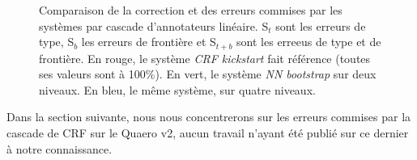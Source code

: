 \documentclass[PhD-Yoann-Dupont.tex]{subfiles}
\begin{document}
\begin{figure}[ht!]
\centering
{}
\caption{Comparaison de la correction et des erreurs commises par les systèmes par cascade d'annotateurs linéaire. S$_{t}$ sont les erreurs de type,  S$_{b}$ les erreurs de frontière et  S$_{t+b}$  sont les erreeus de type et de frontière. En rouge, le système \textit{CRF kickstart} fait référence (toutes ses valeurs sont à 100\%). En vert, le système \textit{NN bootstrap} sur deux niveaux. En bleu, le même système, sur quatre niveaux.}
\label{fig:cascades-error-comparison}
\end{figure}

Dans la section suivante, nous nous concentrerons sur les erreurs commises par la cascade de CRF sur le Quaero v2, aucun travail n'ayant été publié sur ce dernier à notre connaissance.
\end{document}
